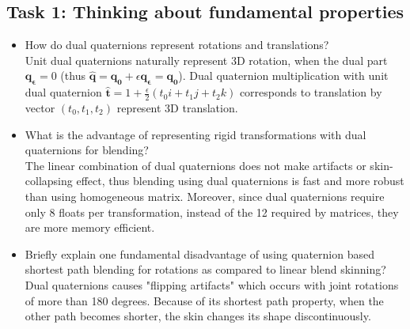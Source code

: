 \documentclass[paper=a4, fontsize=11pt]{scrartcl} %
\numberwithin{equation}{section} %
\numberwithin{figure}{section} %
\numberwithin{table}{section} %
\renewcommand{\vec}[1]{\mathbf{#1}}
\begin{document}
\subsection{Task 1: Thinking about fundamental properties}

\begin{itemize}
	\item How do dual quaternions represent rotations and translations? \\

Unit dual quaternions naturally represent 3D rotation, when the dual part $\vec{q_\epsilon} = 0$ (thus $\hat{\vec{q}} = \vec{q_0} + \epsilon \vec{q_\epsilon} = \vec{q_0}$). Dual quaternion multiplication with unit dual quaternion $\hat{\vec{t}} = 1 + \frac{\epsilon}{2}(t_0 i + t_1 j + t_2 k)$ corresponds to translation by vector $(t_0, t_1, t_2)$ represent 3D translation. \cite{kavan2008geometric} \\
	
	\item What is the advantage of representing rigid transformations with dual quaternions for blending? \\
	
The linear combination of dual quaternions does not make artifacts or skin-collapsing effect, thus blending using dual quaternions is fast and more robust than using homogeneous matrix. Moreover, since dual quaternions require only 8 floats per transformation, instead of the 12 required by matrices, they are more memory efficient. \cite{kavan2008geometric}\\
	
	\item Briefly explain one fundamental disadvantage of using quaternion based shortest path blending for rotations as compared to linear blend skinning? \\
	
Dual quaternions causes "flipping artifacts" which occurs with joint rotations of more than 180 degrees. Because of its shortest path property, when the other path becomes shorter, the skin changes its shape discontinuously. \cite{kavan2008geometric}\\

\end{itemize}


\end{document}
